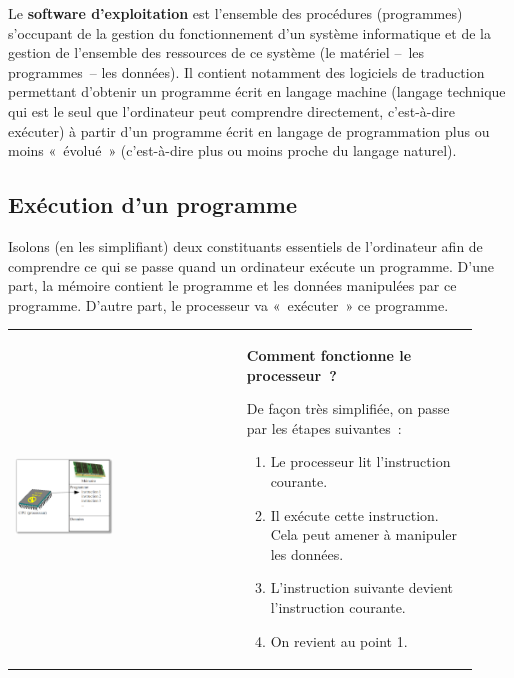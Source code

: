 			Le \textbf{software d’exploitation} 
			est l’ensemble des procédures (programmes) 
			s’occupant de la gestion du fonctionnement 
			d’un système informatique 
			et de la gestion de l’ensemble des ressources de ce système 
			(le matériel –~les programmes~– les données). 
			Il contient notamment des logiciels de traduction 
			permettant d’obtenir un programme écrit en langage machine 
			(langage technique qui est le seul que l’ordinateur 
			peut comprendre directement, c’est-à-dire exécuter) 
			à partir d’un programme écrit en langage de programmation 
			plus ou moins «~évolué~» 
			(c’est-à-dire plus ou moins proche du langage naturel).
	
		\subsection{Exécution d’un programme}
		
			Isolons (en les simplifiant) 
			deux constituants essentiels de l’ordinateur 
			afin de comprendre ce qui se passe 
			quand un ordinateur exécute un programme. 
			D’une part, la mémoire contient le programme 
			et les données manipulées par ce programme. 
			D’autre part, le processeur va «~exécuter~» ce programme.
	
			\begin{tabular}{m{0.46\linewidth}m{0.46\linewidth}}
				\begin{center}
				\includegraphics[width=0.45\textwidth]{image/intro-schema-ordi}
				\end{center}
			&
				\textbf{Comment fonctionne le processeur~?}
		
				De façon très simplifiée, on passe par les étapes suivantes~:
		
				\medskip
				\begin{flushleft}
				\begin{enumerate}
				\item Le processeur lit l’instruction courante.
				\item Il exécute cette instruction. Cela peut amener à manipuler les données.
				\item L’instruction suivante devient l’instruction courante.
				\item On revient au point 1.
				\end{enumerate}
				\end{flushleft}
			\\
			\end{tabular}
	
